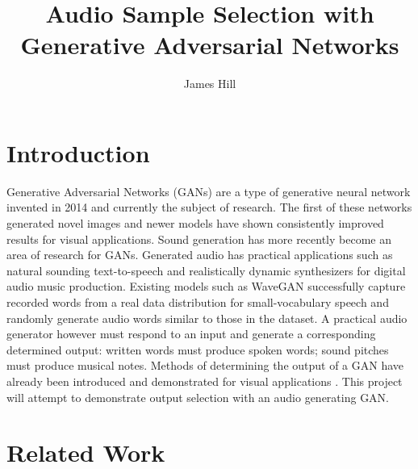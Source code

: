 \documentclass[a4paper, titlepage]{article}
\title{Audio Sample Selection with Generative Adversarial Networks}
\author{James Hill}
\date{}
\begin{document}
\maketitle
\tableofcontents

\newpage

\section{Introduction}

Generative Adversarial Networks (GANs) \cite{2014arXiv1406.2661G} are a type of generative neural network invented in 2014 and currently the subject of research.
The first of these networks generated novel images and newer models have shown consistently improved results for visual applications.
\newline
\newline
Sound generation has more recently become an area of research for GANs.
Generated audio has practical applications such as natural sounding text-to-speech and realistically dynamic synthesizers for digital audio music production.
Existing models such as WaveGAN \cite{2018arXiv180204208D} successfully capture recorded words from a real data distribution for small-vocabulary speech and randomly generate audio words similar to those in the dataset.
\newline
\newline
A practical audio generator however must respond to an input and generate a corresponding determined output: written words must produce spoken words; sound pitches must produce musical notes.
Methods of determining the output of a GAN have already been introduced and demonstrated for visual applications \cite{2014arXiv1411.1784M}.
This project will attempt to demonstrate output selection with an audio generating GAN.

\newpage

\section{Related Work}
\end{document}
